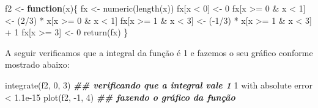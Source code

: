 \documentclass[
  10pt,
  a4paper]{book}
\newenvironment{Shaded}{\begin{snugshade}}{\end{snugshade}}
\newcommand{\ControlFlowTok}[1]{\textcolor[rgb]{0.13,0.29,0.53}{\textbf{#1}}}
\newcommand{\DecValTok}[1]{\textcolor[rgb]{0.00,0.00,0.81}{#1}}
\newcommand{\DocumentationTok}[1]{\textcolor[rgb]{0.56,0.35,0.01}{\textbf{\textit{#1}}}}
\newcommand{\FloatTok}[1]{\textcolor[rgb]{0.00,0.00,0.81}{#1}}
\newcommand{\FunctionTok}[1]{\textcolor[rgb]{0.00,0.00,0.00}{#1}}
\newcommand{\NormalTok}[1]{#1}
\newcommand{\OtherTok}[1]{\textcolor[rgb]{0.56,0.35,0.01}{#1}}
\newcommand{\SpecialCharTok}[1]{\textcolor[rgb]{0.00,0.00,0.00}{#1}}
\begin{document}
\begin{Shaded}
\begin{Highlighting}[]
\NormalTok{f2 }\OtherTok{\textless{}{-}} \ControlFlowTok{function}\NormalTok{(x)\{}
\NormalTok{  fx }\OtherTok{\textless{}{-}} \FunctionTok{numeric}\NormalTok{(}\FunctionTok{length}\NormalTok{(x))}
\NormalTok{  fx[x }\SpecialCharTok{\textless{}} \DecValTok{0}\NormalTok{] }\OtherTok{\textless{}{-}} \DecValTok{0}
\NormalTok{  fx[x }\SpecialCharTok{\textgreater{}=} \DecValTok{0} \SpecialCharTok{\&}\NormalTok{ x }\SpecialCharTok{\textless{}} \DecValTok{1}\NormalTok{] }\OtherTok{\textless{}{-}}\NormalTok{ (}\DecValTok{2}\SpecialCharTok{/}\DecValTok{3}\NormalTok{) }\SpecialCharTok{*}\NormalTok{ x[x }\SpecialCharTok{\textgreater{}=} \DecValTok{0} \SpecialCharTok{\&}\NormalTok{ x }\SpecialCharTok{\textless{}} \DecValTok{1}\NormalTok{]}
\NormalTok{  fx[x }\SpecialCharTok{\textgreater{}=} \DecValTok{1} \SpecialCharTok{\&}\NormalTok{ x }\SpecialCharTok{\textless{}} \DecValTok{3}\NormalTok{] }\OtherTok{\textless{}{-}}\NormalTok{ (}\SpecialCharTok{{-}}\DecValTok{1}\SpecialCharTok{/}\DecValTok{3}\NormalTok{) }\SpecialCharTok{*}\NormalTok{ x[x }\SpecialCharTok{\textgreater{}=} \DecValTok{1} \SpecialCharTok{\&}\NormalTok{ x }\SpecialCharTok{\textless{}} \DecValTok{3}\NormalTok{] }\SpecialCharTok{+} \DecValTok{1}
\NormalTok{  fx[x }\SpecialCharTok{\textgreater{}=} \DecValTok{3}\NormalTok{] }\OtherTok{\textless{}{-}} \DecValTok{0}
  \FunctionTok{return}\NormalTok{(fx)}
\NormalTok{\}}
\end{Highlighting}
\end{Shaded}

A seguir verificamos que a integral da função é 1 e fazemos o seu gráfico
conforme mostrado abaixo:

\begin{Shaded}
\begin{Highlighting}[]
\FunctionTok{integrate}\NormalTok{(f2, }\DecValTok{0}\NormalTok{, }\DecValTok{3}\NormalTok{) }\DocumentationTok{\#\# verificando que a integral vale 1}
\DecValTok{1}\NormalTok{ with absolute error }\SpecialCharTok{\textless{}} \FloatTok{1.1e{-}15}
\FunctionTok{plot}\NormalTok{(f2, }\SpecialCharTok{{-}}\DecValTok{1}\NormalTok{, }\DecValTok{4}\NormalTok{)     }\DocumentationTok{\#\# fazendo o gráfico da função}
\end{Highlighting}
\end{Shaded}
\end{document}
